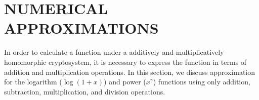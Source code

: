 

\chapter{NUMERICAL APPROXIMATIONS}
In order to calculate a function under a additively and multiplicatively homomorphic cryptosystem, it is necessary to express the function in terms of addition and multiplication operations.
In this section, we discuss approximation for the logarithm ($\log(1+x)$) and power ($x^\gamma$) functions using only addition, subtraction, multiplication, and division operations.

